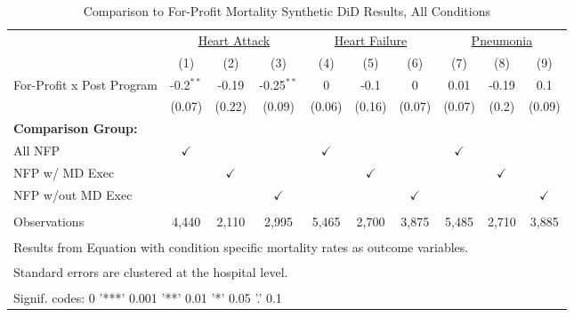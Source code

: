 \begin{table}[ht!]

\caption{\label{tab:fp_mort_condition_synth}Comparison to For-Profit Mortality Synthetic DiD Results, All Conditions}
\centering
\begin{tabular}[t]{lccccccccc}
\toprule
\multicolumn{1}{c}{\underline{ }} & \multicolumn{3}{c}{\underline{Heart Attack}} & \multicolumn{3}{c}{\underline{Heart Failure}} & \multicolumn{3}{c}{\underline{Pneumonia}} \\
 & (1) & (2) & (3) & (4) & (5) & (6) & (7) & (8) & (9)\\
\midrule
For-Profit x Post Program & -0.2$^{**}$ & -0.19 & -0.25$^{**}$ & 0 & -0.1 & 0 & 0.01 & -0.19 & 0.1\\
 & (0.07) & (0.22) & (0.09) & (0.06) & (0.16) & (0.07) & (0.07) & (0.2) & (0.09)\\
\textbf{Comparison Group:} &  &  &  &  &  &  &  &  & \\
All NFP & $\checkmark$ &  &  & $\checkmark$ &  &  & $\checkmark$ &  & \\
NFP w/ MD Exec &  & $\checkmark$ &  &  & $\checkmark$ &  &  & $\checkmark$ & \\
\addlinespace
NFP w/out MD Exec &  &  & $\checkmark$ &  &  & $\checkmark$ &  &  & $\checkmark$\\
 &  &  &  &  &  &  &  &  & \\
Observations & 4,440 & 2,110 & 2,995 & 5,465 & 2,700 & 3,875 & 5,485 & 2,710 & 3,885\\
\bottomrule
\multicolumn{10}{l}{\textsuperscript{} Results from Equation with condition specific mortality rates as outcome variables.}\\
\multicolumn{10}{l}{\textsuperscript{} Standard errors are clustered at the hospital level.}\\
\multicolumn{10}{l}{\textsuperscript{} Signif. codes: 0 '***' 0.001 '**' 0.01 '*' 0.05 '.' 0.1}\\
\end{tabular}
\end{table}
